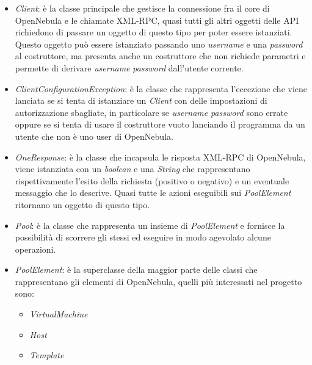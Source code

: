 \begin{itemize}
    \item \emph{Client}: è la classe principale che gestisce la connessione fra il core di OpenNebula e le chiamate XML-RPC, quasi tutti gli altri oggetti delle API richiedono di passare un oggetto di questo tipo per poter essere istanziati. Questo oggetto può essere istanziato passando uno \emph{username} e una \emph{password} al costruttore, ma presenta anche un costruttore che non richiede parametri e permette di derivare \emph{username} \emph{password} dall'utente corrente.
    \item \emph{ClientConfigurationException}: è la classe che rappresenta l'eccezione che viene lanciata se si tenta di istanziare un \emph{Client} con delle impostazioni di autorizzazione sbagliate, in particolare se \emph{username} \emph{password} sono errate oppure se si tenta di usare il costruttore vuoto lanciando il programma da un utente che non è uno user di OpenNebula.
    \item \emph{OneResponse}: è la classe che incapsula le risposta XML-RPC di OpenNebula, viene istanziata con un \emph{boolean} e una \emph{String} che rappresentano rispettivamente l'esito della richiesta (positivo o negativo) e un eventuale messaggio che lo descrive. Quasi tutte le azioni eseguibili sui \emph{PoolElement} ritornano un oggetto di questo tipo.
    \item \emph{Pool}: è la classe che rappresenta un insieme di \emph{PoolElement} e fornisce la possibilità di scorrere gli stessi ed eseguire in modo agevolato alcune operazioni.
    \item \emph{PoolElement}: è la superclasse della maggior parte delle classi che rappresentano gli elementi di OpenNebula, quelli più interessati nel progetto sono:
          \begin{itemize}
              \item \emph{VirtualMachine}
              \item \emph{Host}
              \item \emph{Template}
          \end{itemize}
\end{itemize}

